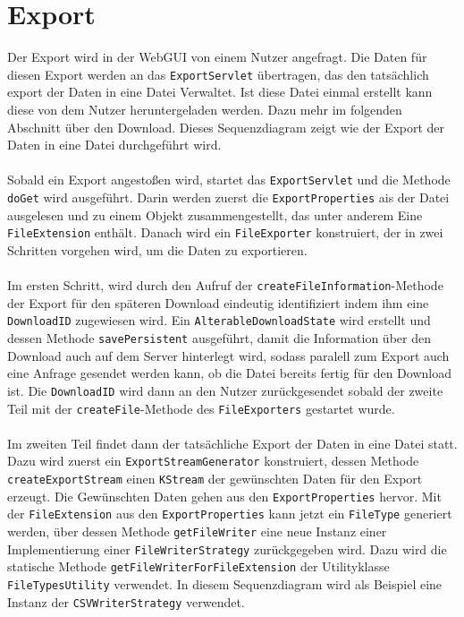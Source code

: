 \section{Export}
Der Export wird in der WebGUI von einem Nutzer angefragt. Die Daten für diesen Export werden an das \texttt{ExportServlet} übertragen, das den tatsächlich export der Daten in eine Datei Verwaltet. Ist diese Datei einmal erstellt kann diese von dem Nutzer heruntergeladen werden. Dazu mehr im folgenden Abschnitt über den Download. Dieses Sequenzdiagram zeigt wie der Export der Daten in eine Datei durchgeführt wird.\\\\
Sobald ein Export angestoßen wird, startet das \texttt{ExportServlet} und die Methode \texttt{doGet} wird ausgeführt. Darin werden zuerst die \texttt{ExportProperties} ais der Datei ausgelesen und zu einem Objekt zusammengestellt, das unter anderem Eine \texttt{FileExtension} enthält. Danach wird ein \texttt{FileExporter} konstruiert, der in zwei Schritten vorgehen wird, um die Daten zu exportieren.\\\\
Im ersten Schritt, wird durch den Aufruf der \texttt{createFileInformation}-Methode der Export für den späteren Download eindeutig identifiziert indem ihm eine \texttt{DownloadID} zugewiesen wird. Ein \texttt{AlterableDownloadState} wird erstellt und dessen Methode \texttt{savePersistent} ausgeführt, damit die Information über den Download auch auf dem Server hinterlegt wird, sodass paralell zum Export auch eine Anfrage gesendet werden kann, ob die Datei bereits fertig für den Download ist. Die \texttt{DownloadID} wird dann an den Nutzer zurückgesendet sobald der zweite Teil mit der \texttt{createFile}-Methode des \texttt{FileExporters} gestartet wurde.\\\\
Im zweiten Teil findet dann der tatsächliche Export der Daten in eine Datei statt. Dazu wird zuerst ein \texttt{ExportStreamGenerator} konstruiert, dessen Methode \texttt{createExportStream} einen \texttt{KStream} der gewünschten Daten für den Export erzeugt. Die Gewünschten Daten gehen aus den \texttt{ExportProperties} hervor. Mit der \texttt{FileExtension} aus den \texttt{ExportProperties} kann jetzt ein \texttt{FileType} generiert werden, über dessen Methode \texttt{getFileWriter} eine neue Instanz einer Implementierung einer \texttt{FileWriterStrategy} zurückgegeben wird. Dazu wird die statische Methode \texttt{getFileWriterForFileExtension} der Utilityklasse \texttt{FileTypesUtility} verwendet. In diesem Sequenzdiagram wird als Beispiel eine Instanz der \texttt{CSVWriterStrategy} verwendet.\\\\

